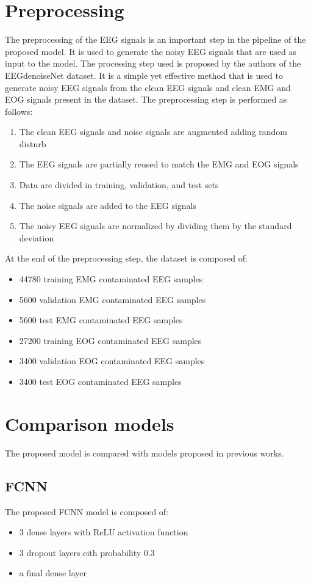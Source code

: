 \documentclass[a4paper]{sapthesis}
\begin{document}
\section{Preprocessing}
The preprocessing of the EEG signals is an important step in the
pipeline of the proposed model. It is used to generate the noisy EEG
signals that are used as input to the model.
The processing step used is proposed by the authors of the EEGdenoiseNet
dataset\cite{EEGdenoiseNet}. It is a simple yet effective method that
is used to generate noisy EEG signals from the clean EEG signals and clean 
EMG and EOG signals present in the dataset.
The preprocessing step is performed as follows:
\begin{enumerate}
\item The clean EEG signals and noise signals are augmented adding 
random disturb
\item The EEG signals are partially reused to match the EMG and EOG
signals
\item Data are divided in training, validation, and test sets
\item The noise signals are added to the EEG signals
\item The noisy EEG signals are normalized by dividing them by the
standard deviation
\end{enumerate}
At the end of the preprocessing step, the dataset is composed of:
\begin{itemize}
\item 44780 training EMG contaminated EEG samples
\item 5600 validation EMG contaminated EEG samples
\item 5600 test EMG contaminated EEG samples
\item 27200 training EOG contaminated EEG samples
\item 3400 validation EOG contaminated EEG samples
\item 3400 test EOG contaminated EEG samples
\end{itemize}
\section{Comparison models}
The proposed model is compared with models proposed in previous works.\cite{EEGdenoiseNet}
\subsection{FCNN}\label{sec:model_fcnn}
The proposed FCNN model is composed of:
\begin{itemize}
\item 3 dense layers with ReLU activation function
\item 3 dropout layers eith probability 0.3
\item a final dense layer
\end{itemize}
\end{document}
